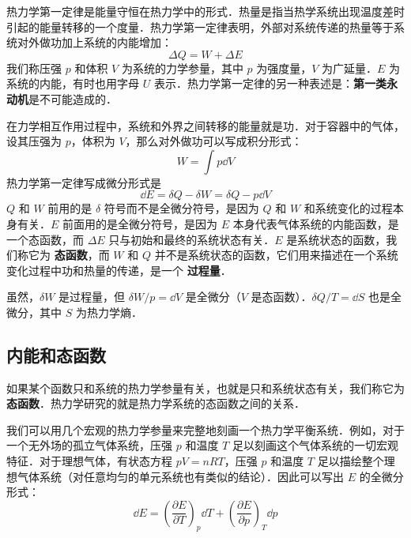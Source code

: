 
\begin{issues}
\issueDraft
\end{issues}


热力学第一定律是能量守恒在热力学中的形式．热量是指当热学系统出现温度差时引起的能量转移的一个度量．热力学第一定律表明，外部对系统传递的热量等于系统对外做功加上系统的内能增加：
\begin{equation}\label{Th1Law_eq1}
\Delta Q = W + \Delta E
\end{equation}
我们称压强 $p$ 和体积 $V$ 为系统的力学参量，其中 $p$ 为强度量，$V$ 为广延量．$E$ 为系统的内能，有时也用字母 $U$ 表示．热力学第一定律的另一种表述是：\textbf{第一类永动机}是不可能造成的．


在力学相互作用过程中，系统和外界之间转移的能量就是功．对于容器中的气体，设其压强为 $p$，体积为 $V$，那么对外做功可以写成积分形式：
\begin{equation}
W = \int p \dd{V}
\end{equation}
热力学第一定律写成微分形式是
\begin{equation}\label{Th1Law_eq2}
\dd E=\delta Q-\delta W=\delta Q-p\dd V
\end{equation}
$Q$ 和 $W$ 前用的是 $\delta$ 符号而不是全微分符号，是因为 $Q$ 和 $W$ 和系统变化的过程本身有关．$E$ 前面用的是全微分符号，是因为 $E$ 本身代表气体系统的内能函数，是一个态函数，而 $\Delta E$ 只与初始和最终的系统状态有关．$E$ 是系统状态的函数，我们称它为 \textbf{态函数}，而 $W$ 和 $Q$ 并不是系统状态的函数，它们用来描述在一个系统变化过程中功和热量的传递，是一个 \textbf{过程量}．

虽然，$\delta W$ 是过程量，但 $\delta W/p=\dd V$ 是全微分（$V$ 是态函数）．$\delta Q/T=\dd S$ 也是全微分，其中 $S$ 为热力学熵．

\subsection{内能和态函数}
如果某个函数只和系统的热力学参量有关，也就是只和系统状态有关，我们称它为\textbf{态函数}．热力学研究的就是热力学系统的态函数之间的关系．

我们可以用几个宏观的热力学参量来完整地刻画一个热力学平衡系统．例如，对于一个无外场的孤立气体系统，压强 $p$ 和温度 $T$ 足以刻画这个气体系统的一切宏观特征．对于理想气体，有状态方程 $pV=nRT$，压强 $p$ 和温度 $T$ 足以描绘整个理想气体系统（对任意均匀的单元系统也有类似的结论）．因此可以写出 $E$ 的全微分形式：
\begin{equation}
\dd E=\left(\frac{\partial E}{\partial T}\right)_p \dd T + \left(\frac{\partial E}{\partial p}\right)_T \dd p
\end{equation}

